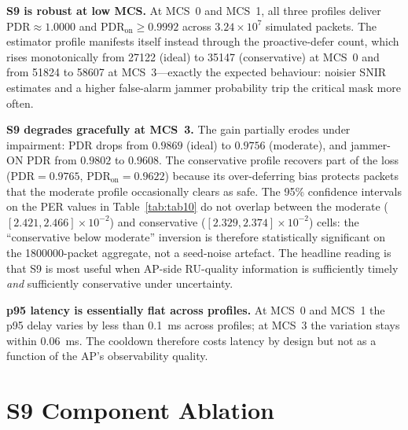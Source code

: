 \documentclass[journal,onecolumn,11pt,a4paper]{IEEEtran}
\begin{document}
\textbf{S9 is robust at low MCS.} At MCS~0 and MCS~1, all three
profiles deliver $\mathrm{PDR}\approx 1.0000$ and
$\mathrm{PDR}_{\mathrm{on}}\ge 0.9992$ across $3.24\times 10^7$
simulated packets. The estimator profile manifests itself instead
through the proactive-defer count, which rises monotonically from
\num{27122} (ideal) to \num{35147} (conservative) at MCS~0 and from
\num{51824} to \num{58607} at MCS~3---exactly the expected behaviour:
noisier SNIR estimates and a higher false-alarm jammer probability
trip the critical mask more often.

\textbf{S9 degrades gracefully at MCS~3.} The gain partially erodes
under impairment: PDR drops from $0.9869$ (ideal) to $0.9756$
(moderate), and jammer-ON PDR from $0.9802$ to $0.9608$. The
conservative profile recovers part of the loss ($\mathrm{PDR}=0.9765$,
$\mathrm{PDR}_{\mathrm{on}}=0.9622$) because its over-deferring bias
protects packets that the moderate profile occasionally clears as
safe. The 95\% confidence intervals on the PER values in
Table~\ref{tab:tab10} do not overlap between the moderate
($[2.421, 2.466]\times 10^{-2}$) and conservative
($[2.329, 2.374]\times 10^{-2}$) cells: the
``conservative below moderate'' inversion is therefore
statistically significant on the \num{1800000}-packet aggregate, not
a seed-noise artefact. The headline reading is that S9 is most useful
when AP-side RU-quality information is sufficiently timely
\emph{and} sufficiently conservative under uncertainty.

\textbf{p95 latency is essentially flat across profiles.} At MCS~0
and MCS~1 the p95 delay varies by less than \SI{0.1}{ms} across
profiles; at MCS~3 the variation stays within \SI{0.06}{ms}. The
cooldown therefore costs latency by design but not as a function of
the AP's observability quality.

\section{S9 Component Ablation}
\label{sec:tab11}
\end{document}
